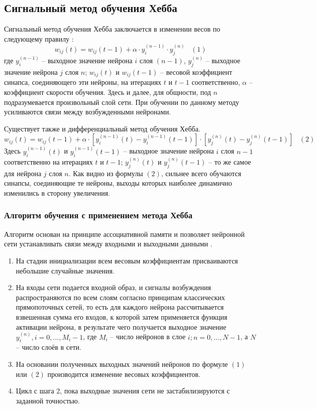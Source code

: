 \documentclass[bachelor, och, referat]{SCWorks}
\begin{document}
\subsection{Сигнальный метод обучения Хебба}
Сигнальный метод обучения Хебба заключается в изменении весов по следующему
правилу \cite{hebb1}:
\[ w_{ij}(t) = w_{ij}(t - 1) + \alpha \cdot y_i^{(n - 1)} \cdot y_j^{(n)} \; \; \; (1)\]
где $y_i^{(n - 1)}$ -- выходное значение нейрона $i$ слоя 
$(n - 1)$, $y_j^{(n)}$ -- выходное значение нейрона $j$ слоя $n$;
$w_{ij}(t)$ и $w_{ij}(t - 1)$ -- весовой коэффициент синапса, 
соединяющего эти нейроны, на итерациях $t$ и $t - 1$ соответственно,
$\alpha$ -- коэффициент скорости обучения. Здесь и далее, для
общности, под $n$ подразумевается произвольный слой сети. 
При обучении по данному методу усиливаются связи между возбужденными нейронами. 

Существует также и дифференциальный метод обучения Хебба.
\[ w_{ij}(t) = w_{ij}(t - 1) + \alpha \cdot [y_i^{(n-1)}(t) - 
y_i^{(n - 1)}(t - 1)] \cdot [y_j^{(n)}(t) - y_j^{(n)}(t - 1)] \; \; \; (2)\]
Здесь $y_i^{(n-1)}(t)$ и $y_i^{(n - 1)}(t - 1)$ -- выходное
значение нейрона $i$ слоя $n - 1$ соответственно на итерациях
$t$ и $t - 1$; $y_j^{(n)}(t)$ и $y_j^{(n)}(t - 1)$ -- то же самое
для нейрона $j$ слоя $n$. Как видно из формулы $(2)$,
сильнее всего обучаются синапсы, соединяющие те нейроны,
выходы которых наиболее динамично изменились в сторону увеличения.

\subsubsection{Алгоритм обучения с применением метода Хебба}
Алгоритм основан на принципе ассоциативной памяти и позволяет нейронной сети устанавливать связи между входными и выходными данными \cite{hebb2}.
\begin{enumerate}
    \item На стадии инициализации всем весовым коэффициентам присваиваются небольшие
    случайные значения.
    \item На входы сети подается входной образ, и сигналы возбуждения распространяются по
    всем слоям согласно принципам классических прямопоточных сетей, 
    то есть для каждого нейрона рассчитывается взвешенная сумма его входов, 
    к которой затем применяется функция активации нейрона, в результате
    чего получается выходное значение $y_i^{(n)}, i = 0, \dots, M_i - 1$,
    где $M_i$ -- число нейронов в слое $i; n = 0, \dots, N - 1$, а $N$
    -- число слоёв в сети.
    \item На основании полученных выходных значений нейронов по формуле $(1)$ или $(2)$
    производится изменение весовых коэффициентов. 
    \item Цикл с шага 2, пока выходные значения сети не застабилизируются с заданной точностью.
\end{enumerate}
\end{document}
